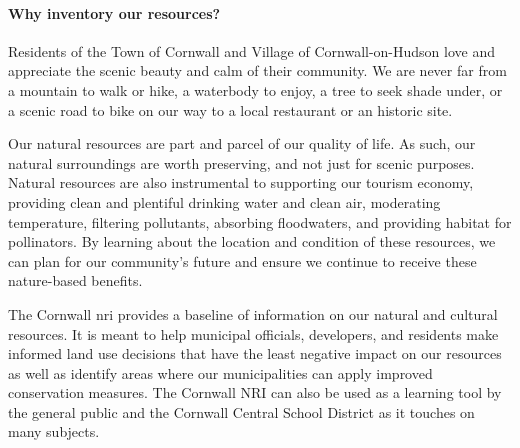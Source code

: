 \paragraph{Why inventory our resources?} Residents of the Town of Cornwall 
and Village of Cornwall-on-Hudson love and appreciate the scenic beauty and 
calm of their community. We are never far from a mountain to walk or hike, a 
waterbody to enjoy, a tree to seek shade under, or a scenic road to bike on our 
way to a local restaurant or an historic site.
\par
Our natural resources are part and parcel of our quality of life. As such, our 
natural surroundings are worth preserving, and not just for scenic purposes. 
Natural resources are also instrumental to supporting our tourism economy, 
providing clean and plentiful drinking water and clean air, moderating 
temperature, filtering pollutants, absorbing floodwaters, and providing habitat 
for pollinators. By learning about the location and condition of these 
resources, we can plan for our community’s future and ensure we continue to 
receive these nature-based benefits.
\par
The Cornwall \gls{nri} provides a baseline of information on our natural and 
cultural resources. It is meant to help municipal officials, developers, and 
residents make informed land use decisions that have the least negative impact 
on our resources as well as identify areas where our municipalities can apply 
improved conservation measures. The Cornwall NRI can also be used as a 
learning tool by the general public and the Cornwall Central School District as 
it touches on many subjects.
